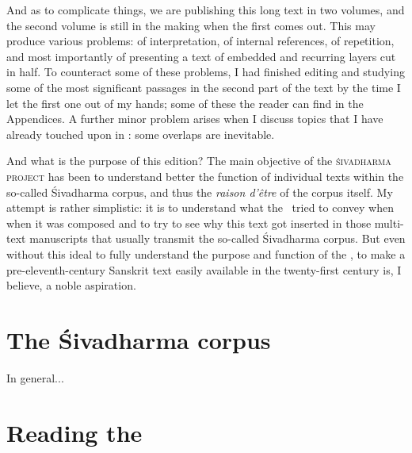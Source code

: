 \documentclass[11pt]{book}
\begin{document}
And as to complicate things, we are publishing this long text
in two volumes, and the second volume is still in the making
when the first comes out. This may produce various problems:
of interpretation, of internal references, of repetition, 
and most importantly of presenting a text of
embedded and recurring layers cut in half. To counteract
some of these problems, I had finished editing and 
studying some of the most significant passages in 
the second part of the text by the time I let the first one
out of my hands; some of these the reader can find in 
the Appendices. A further minor problem arises when
I discuss topics that I have already touched upon in : some overlaps are inevitable.

And what is the purpose of this edition? The main 
objective of the \textsc{śiva\-dharma project} 
has been to understand better the function of 
individual texts within the so-called Śivadharma corpus,
and thus the \emph{raison d'être} of the corpus itself. 
My attempt is rather simplistic: it is to understand
what the \Vss\ tried to convey when when it was composed and
to try to see why this text got inserted in those multi-text 
manuscripts that usually transmit the so-called Śivadharma corpus.
But even without this ideal to fully understand the purpose and function 
of the \Vss, to make a pre-eleventh-century
Sanskrit text easily available in the twenty-first century is, I believe, 
a noble aspiration.

\vfill
\pagebreak










\thispagestyle{empty}
\frenchspacing





\section{The Śivadharma corpus}
\fancyhead[LE]{}
\fancyhead[RE]{}
\fancyhead[LO]{}
\fancyhead[RO]{}

In general...

\section{Reading the \Vsssc}
\end{document}
